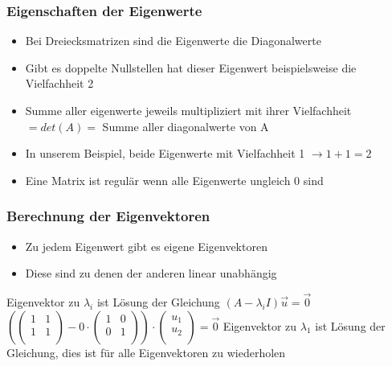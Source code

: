 \begin{frame}
    \frametitle{Eigenschaften der Eigenwerte}
    \begin{itemize}
        \item Bei Dreiecksmatrizen sind die Eigenwerte die Diagonalwerte
        \item Gibt es doppelte Nullstellen hat dieser Eigenwert beispielsweise die Vielfachheit 2
        \item  Summe aller eigenwerte jeweils multipliziert mit ihrer Vielfachheit $= det(A) =$ Summe aller diagonalwerte von A
        \item In unserem Beispiel, beide Eigenwerte mit Vielfachheit 1 $\rightarrow 1+1 = 2$
        \item Eine Matrix ist regulär wenn alle Eigenwerte ungleich 0 sind
    \end{itemize}
\end{frame}
\begin{frame}
    \frametitle{Berechnung der Eigenvektoren}
    \begin{itemize}
        \item Zu jedem Eigenwert gibt es eigene Eigenvektoren
        \item Diese sind zu denen der anderen linear unabhängig
    \end{itemize}
    Eigenvektor zu $\lambda _{i}$ ist Lösung der Gleichung $(A - \lambda _{i} I) \vec{u} = \vec{0}$
    $(\begin{pmatrix}
        1 & 1 \\
        1 & 1 \\
    \end{pmatrix} - 0 \cdot \begin{pmatrix}
        1 & 0 \\
        0 & 1 \\
    \end{pmatrix}) \cdot \begin{pmatrix}
        u _{1} \\
        u _{2} \\
    \end{pmatrix} = \vec{0}$
    \newline
    Eigenvektor zu $\lambda _{1}$ ist Lösung der Gleichung, dies ist für alle Eigenvektoren zu wiederholen
\end{frame}

